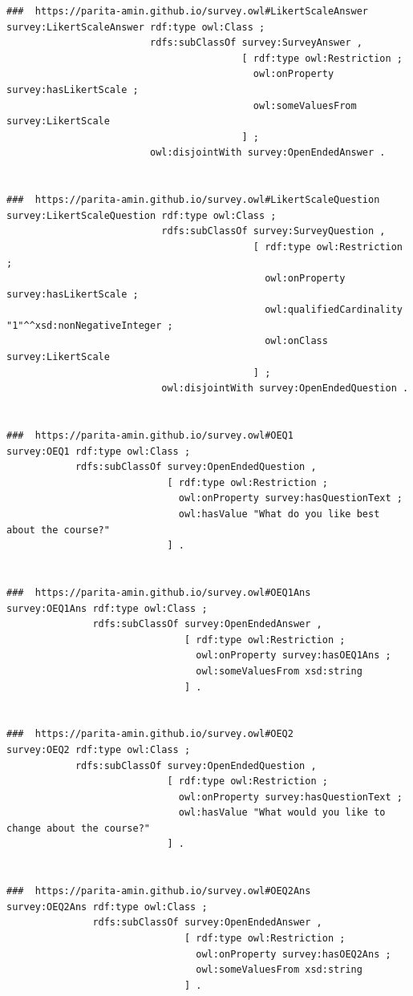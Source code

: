\begin{lstlisting}
###  https://parita-amin.github.io/survey.owl#LikertScaleAnswer
survey:LikertScaleAnswer rdf:type owl:Class ;
                         rdfs:subClassOf survey:SurveyAnswer ,
                                         [ rdf:type owl:Restriction ;
                                           owl:onProperty survey:hasLikertScale ;
                                           owl:someValuesFrom survey:LikertScale
                                         ] ;
                         owl:disjointWith survey:OpenEndedAnswer .


###  https://parita-amin.github.io/survey.owl#LikertScaleQuestion
survey:LikertScaleQuestion rdf:type owl:Class ;
                           rdfs:subClassOf survey:SurveyQuestion ,
                                           [ rdf:type owl:Restriction ;
                                             owl:onProperty survey:hasLikertScale ;
                                             owl:qualifiedCardinality "1"^^xsd:nonNegativeInteger ;
                                             owl:onClass survey:LikertScale
                                           ] ;
                           owl:disjointWith survey:OpenEndedQuestion .


###  https://parita-amin.github.io/survey.owl#OEQ1
survey:OEQ1 rdf:type owl:Class ;
            rdfs:subClassOf survey:OpenEndedQuestion ,
                            [ rdf:type owl:Restriction ;
                              owl:onProperty survey:hasQuestionText ;
                              owl:hasValue "What do you like best about the course?"
                            ] .


###  https://parita-amin.github.io/survey.owl#OEQ1Ans
survey:OEQ1Ans rdf:type owl:Class ;
               rdfs:subClassOf survey:OpenEndedAnswer ,
                               [ rdf:type owl:Restriction ;
                                 owl:onProperty survey:hasOEQ1Ans ;
                                 owl:someValuesFrom xsd:string
                               ] .


###  https://parita-amin.github.io/survey.owl#OEQ2
survey:OEQ2 rdf:type owl:Class ;
            rdfs:subClassOf survey:OpenEndedQuestion ,
                            [ rdf:type owl:Restriction ;
                              owl:onProperty survey:hasQuestionText ;
                              owl:hasValue "What would you like to change about the course?"
                            ] .


###  https://parita-amin.github.io/survey.owl#OEQ2Ans
survey:OEQ2Ans rdf:type owl:Class ;
               rdfs:subClassOf survey:OpenEndedAnswer ,
                               [ rdf:type owl:Restriction ;
                                 owl:onProperty survey:hasOEQ2Ans ;
                                 owl:someValuesFrom xsd:string
                               ] .



\end{lstlisting}
